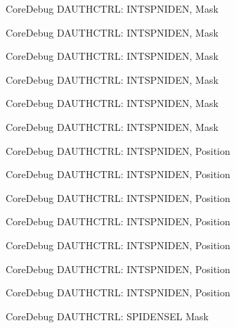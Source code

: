 \begin{DoxyRefList}
\label{deprecated__deprecated000140}%
%
Core\+Debug D\+A\+U\+T\+H\+C\+T\+RL\+: I\+N\+T\+S\+P\+N\+I\+D\+EN, Mask 

\label{deprecated__deprecated000216}%
%
Core\+Debug D\+A\+U\+T\+H\+C\+T\+RL\+: I\+N\+T\+S\+P\+N\+I\+D\+EN, Mask 

\label{deprecated__deprecated000279}%
%
Core\+Debug D\+A\+U\+T\+H\+C\+T\+RL\+: I\+N\+T\+S\+P\+N\+I\+D\+EN, Mask 

\label{deprecated__deprecated000358}%
%
Core\+Debug D\+A\+U\+T\+H\+C\+T\+RL\+: I\+N\+T\+S\+P\+N\+I\+D\+EN, Mask 

\label{deprecated__deprecated000434}%
%
Core\+Debug D\+A\+U\+T\+H\+C\+T\+RL\+: I\+N\+T\+S\+P\+N\+I\+D\+EN, Mask 

\label{deprecated__deprecated000537}%
%
Core\+Debug D\+A\+U\+T\+H\+C\+T\+RL\+: I\+N\+T\+S\+P\+N\+I\+D\+EN, Mask  
\item[Member \mbox{\hyperlink{group__CMSIS__CoreDebug_gaf733a36e6b4717a604f7d77c05dfceb4}{Core\+Debug\+\_\+\+D\+A\+U\+T\+H\+C\+T\+R\+L\+\_\+\+I\+N\+T\+S\+P\+N\+I\+D\+E\+N\+\_\+\+Pos}} ]\label{deprecated__deprecated000085}%
%
Core\+Debug D\+A\+U\+T\+H\+C\+T\+RL\+: I\+N\+T\+S\+P\+N\+I\+D\+EN, Position 

\label{deprecated__deprecated000139}%
%
Core\+Debug D\+A\+U\+T\+H\+C\+T\+RL\+: I\+N\+T\+S\+P\+N\+I\+D\+EN, Position 

\label{deprecated__deprecated000215}%
%
Core\+Debug D\+A\+U\+T\+H\+C\+T\+RL\+: I\+N\+T\+S\+P\+N\+I\+D\+EN, Position 

\label{deprecated__deprecated000278}%
%
Core\+Debug D\+A\+U\+T\+H\+C\+T\+RL\+: I\+N\+T\+S\+P\+N\+I\+D\+EN, Position 

\label{deprecated__deprecated000357}%
%
Core\+Debug D\+A\+U\+T\+H\+C\+T\+RL\+: I\+N\+T\+S\+P\+N\+I\+D\+EN, Position 

\label{deprecated__deprecated000433}%
%
Core\+Debug D\+A\+U\+T\+H\+C\+T\+RL\+: I\+N\+T\+S\+P\+N\+I\+D\+EN, Position 

\label{deprecated__deprecated000536}%
%
Core\+Debug D\+A\+U\+T\+H\+C\+T\+RL\+: I\+N\+T\+S\+P\+N\+I\+D\+EN, Position  
\item[Member \mbox{\hyperlink{group__CMSIS__CoreDebug_gaa043fd13768d57be320c682ca1c9b234}{Core\+Debug\+\_\+\+D\+A\+U\+T\+H\+C\+T\+R\+L\+\_\+\+S\+P\+I\+D\+E\+N\+S\+E\+L\+\_\+\+Msk}} ]\label{deprecated__deprecated000092}%
%
Core\+Debug D\+A\+U\+T\+H\+C\+T\+RL\+: S\+P\+I\+D\+E\+N\+S\+EL Mask 


\end{DoxyRefList}
